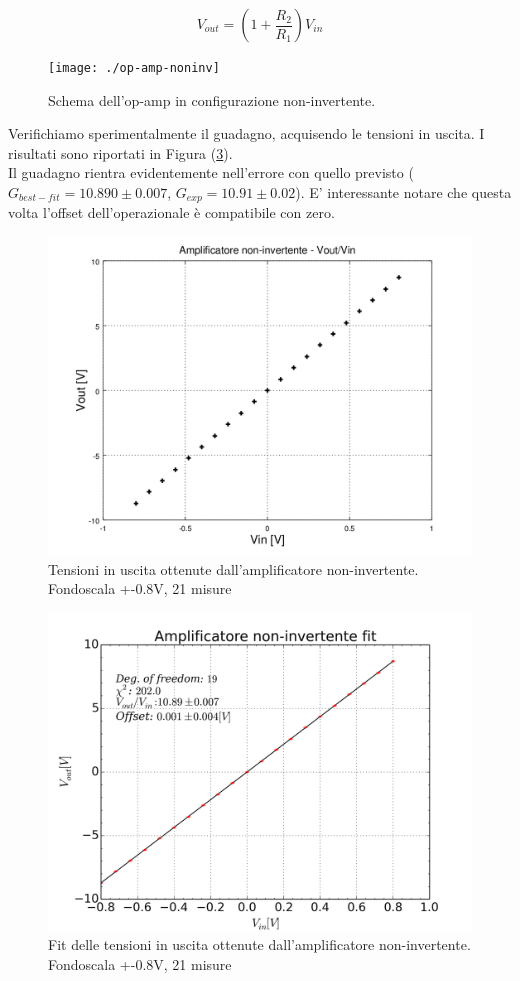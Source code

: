 \documentclass[journal, a4paper]{IEEEtran}
\begin{document}
\begin{equation}
V_{out} = (1 +\frac{R_2}{R_1})V_{in}
\end{equation}

\begin{figure}
\centering
\texttt{[image: ./op-amp-noninv]}
\caption{Schema dell'op-amp in configurazione non-invertente.}
\label{fig:op-amp-noninv}
\end{figure}


Verifichiamo sperimentalmente il guadagno, acquisendo le tensioni in uscita. I risultati sono riportati in Figura (\ref{fig:fit_non-invertente}).	\\
Il guadagno rientra evidentemente nell'errore con quello previsto ($G_{best-fit} = 10.890 \pm 0.007$, $G_{exp} = 10.91 \pm 0.02$). E' interessante notare che questa volta l'offset dell'operazionale è compatibile con zero.\\

\begin{figure}
\centering
\includegraphics[width=0.9\linewidth]{./non-inv_0_8-21_no_rgen_2mo}
\caption{Tensioni in uscita ottenute dall'amplificatore non-invertente. Fondoscala +-0.8V, 21 misure}
\label{fig:non-inv_0_8-21_no_rgen_2mo}
\end{figure}

\begin{figure}
\centering
\includegraphics[width=0.9\linewidth]{./fit_non-invertente}
\caption{Fit delle tensioni in uscita ottenute dall'amplificatore non-invertente. Fondoscala +-0.8V, 21 misure}
\label{fig:fit_non-invertente}
\end{figure}
\end{document}
